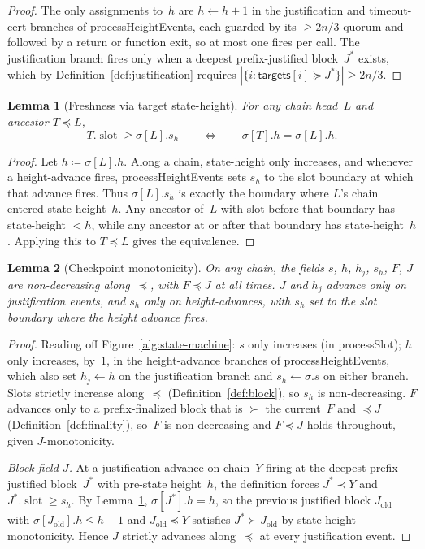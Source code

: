 \ifx\litemode\undefined\documentclass{article}\fi
\newcommand{\slot}[0]{\ensuremath{\operatorname{\mathrm{slot}}}}
\newcommand{\targets}{\mathsf{targets}}
\newcommand{\processSlot}{\textsf{processSlot}\xspace}
\newcommand{\processHeightEvents}{\textsf{processHeightEvents}\xspace}
\theoremstyle{plain}
\newtheorem{lemma}{Lemma}
\theoremstyle{definition}
\theoremstyle{remark}
\begin{document}
\begin{proof}
The only assignments to~$h$ are $h \gets h + 1$ in the justification and timeout-cert branches of \processHeightEvents, each guarded by its $\geq 2n/3$ quorum and followed by a return or function exit, so at most one fires per call.
The justification branch fires only when a deepest prefix-justified block~$J^*$ exists, which by Definition~\ref{def:justification} requires $|\{i : \targets[i] \succeq J^*\}| \geq 2n/3$.
\end{proof}

\begin{lemma}[Freshness via target state-height]\label{lem:fresh-equiv}
For any chain head~$L$ and ancestor $T \preceq L$,
\[
  T.\slot \geq \sigma[L].s_h
  \qquad\Longleftrightarrow\qquad
  \sigma[T].h = \sigma[L].h .
\]
\end{lemma}

\begin{proof}
Let $h \coloneqq \sigma[L].h$.
Along a chain, state-height only increases, and whenever a height-advance fires, \processHeightEvents sets $s_h$ to the slot boundary at which that advance fires.
Thus $\sigma[L].s_h$ is exactly the boundary where $L$'s chain entered state-height~$h$.
Any ancestor of~$L$ with slot before that boundary has state-height $< h$, while any ancestor at or after that boundary has state-height~$h$.
Applying this to $T \preceq L$ gives the equivalence.
\end{proof}

\begin{lemma}[Checkpoint monotonicity]\label{lem:slotmono}
On any chain, the fields $s$, $h$, $h_j$, $s_h$, $F$, $J$ are non-decreasing along~$\preceq$, with $F \preceq J$ at all times.
$J$ and $h_j$ advance only on justification events, and $s_h$ only on height-advances, with $s_h$ set to the slot boundary where the height advance fires.
\end{lemma}

\begin{proof}
Reading off Figure~\ref{alg:state-machine}: $s$ only increases (in \processSlot); $h$ only increases, by~$1$, in the height-advance branches of \processHeightEvents, which also set $h_j \gets h$ on the justification branch and $s_h \gets \sigma.s$ on either branch.
Slots strictly increase along~$\preceq$ (Definition~\ref{def:block}), so $s_h$ is non-decreasing.
$F$ advances only to a prefix-finalized block that is $\succ$ the current~$F$ and $\preceq J$ (Definition~\ref{def:finality}), so~$F$ is non-decreasing and $F \preceq J$ holds throughout, given $J$-monotonicity.

\emph{Block field $J$.}
At a justification advance on chain~$Y$ firing at the deepest prefix-justified block~$J^*$ with pre-state height~$h$, the definition forces $J^* \prec Y$ and $J^*.\slot \geq s_h$.
By Lemma~\ref{lem:fresh-equiv}, $\sigma[J^*].h = h$, so the previous justified block $J_{\mathrm{old}}$ with $\sigma[J_{\mathrm{old}}].h \leq h-1$ and $J_{\mathrm{old}} \preceq Y$ satisfies $J^* \succ J_{\mathrm{old}}$ by state-height monotonicity.
Hence $J$ strictly advances along~$\preceq$ at every justification event.
\end{proof}
\end{document}
